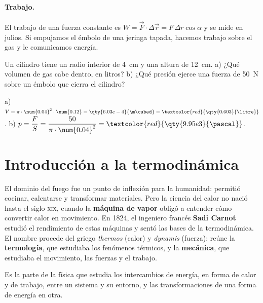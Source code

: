 \paragraph{Trabajo.} El trabajo de una fuerza constante es \(W = \vec F \cdot \Delta\vec r = F\,\Delta r\cos\alpha\) y se mide en
julios. Si empujamos el émbolo de una jeringa tapada, hacemos trabajo sobre el gas y le comunicamos energía.

\begin{exercise}
    Un cilindro tiene un radio interior de \qty{4}{\cm} y una altura de \qty{12}{\cm}. a) ¿Qué volumen de gas cabe dentro, en litros?
    b) ¿Qué presión ejerce una fuerza de \qty{50}{\newton} sobre un émbolo que cierra el cilindro?
    \begin{solu}
        a) \(V = \pi \cdot \num{0.04}^2 \cdot \num{0.12} = \qty{6.03e-4}{\m\cubed} = \textcolor{red}{\qty{0.603}{\litre}}\).
        b) \(p = \dfrac{F}{S} = \dfrac{50}{\pi \cdot \num{0.04}^2} = \textcolor{red}{\qty{9.95e3}{\pascal}}\).
    \end{solu}
\end{exercise}

\section{Introducción a la termodinámica}\label{sec:ud13-introduccion}

El dominio del fuego fue un punto de inflexión para la humanidad: permitió cocinar, calentarse y transformar materiales. Pero la
ciencia del calor no nació hasta el siglo \textsc{xix}, cuando la \textbf{máquina de vapor} obligó a entender cómo convertir calor
en movimiento. En 1824, el ingeniero francés \textbf{Sadi Carnot} estudió el rendimiento de estas máquinas y sentó las bases de la
termodinámica. El nombre procede del griego \textit{thermos} (calor) y \textit{dynamis} (fuerza): reúne la \textbf{termología}, que
estudiaba los fenómenos térmicos, y la \textbf{mecánica}, que estudiaba el movimiento, las fuerzas y el trabajo.

\begin{definition}[Termodinámica]
    Es la parte de la física que estudia los intercambios de energía, en forma de calor y de trabajo, entre un sistema y su
    entorno, y las transformaciones de una forma de energía en otra.
\end{definition}

